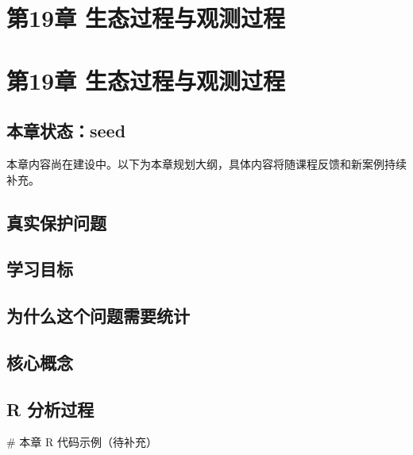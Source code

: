 \documentclass[
  letterpaper,
]{scrbook}
\newenvironment{Shaded}{\begin{snugshade}}{\end{snugshade}}
\newcommand{\CommentTok}[1]{\textcolor[rgb]{0.37,0.37,0.37}{#1}}
\begin{document}
\chapter{第19章
生态过程与观测过程}\label{ux7b2c19ux7ae0-ux751fux6001ux8fc7ux7a0bux4e0eux89c2ux6d4bux8fc7ux7a0b}

\chapter{第19章
生态过程与观测过程}\label{ux7b2c19ux7ae0-ux751fux6001ux8fc7ux7a0bux4e0eux89c2ux6d4bux8fc7ux7a0b-1}

\section{本章状态：seed}\label{ux672cux7ae0ux72b6ux6001seed-8}

本章内容尚在建设中。以下为本章规划大纲，具体内容将随课程反馈和新案例持续补充。

\section{真实保护问题}\label{ux771fux5b9eux4fddux62a4ux95eeux9898-15}

\section{学习目标}\label{ux5b66ux4e60ux76eeux6807-11}

\section{为什么这个问题需要统计}\label{ux4e3aux4ec0ux4e48ux8fd9ux4e2aux95eeux9898ux9700ux8981ux7edfux8ba1-8}

\section{核心概念}\label{ux6838ux5fc3ux6982ux5ff5-8}

\section{R 分析过程}\label{r-ux5206ux6790ux8fc7ux7a0b-10}

\begin{Shaded}
\begin{Highlighting}[]
\CommentTok{\# 本章 R 代码示例（待补充）}
\end{Highlighting}
\end{Shaded}
\end{document}
